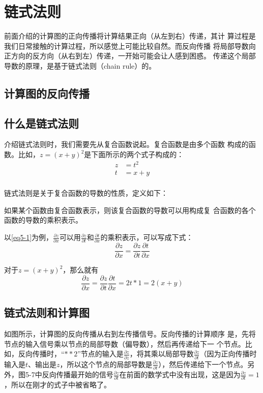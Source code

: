 \section{链式法则}
前面介绍的计算图的正向传播将计算结果正向（从左到右）传递，其计
算过程是我们日常接触的计算过程，所以感觉上可能比较自然。而反向传播
将局部导数向正方向的反方向（从右到左）传递，一开始可能会让人感到困惑。
传递这个局部导数的原理，是基于链式法则（chain rule）的。
\subsection{计算图的反向传播}

\subsection{什么是链式法则}
介绍链式法则时，我们需要先从复合函数说起。复合函数是由多个函数
构成的函数。比如，$z = (x + y)^2$是下面所示的两个式子构成的：
\begin{equation}
    \label{eq5-1}
    \begin{aligned}
        z & =t^2 \\
        t & =x+y \\
    \end{aligned}
\end{equation}

链式法则是关于复合函数的导数的性质，定义如下：
\begin{tcolorbox}
    如果某个函数由复合函数表示，则该复合函数的导数可以用构成复
    合函数的各个函数的导数的乘积表示。
\end{tcolorbox}

以\autoref{eq5-1}为例，$\frac{\partial z}{\partial x}$可以用$\frac{\partial z}{\partial t}$和$\frac{\partial t}{\partial x}$的乘积表示，可以写成下式：
\begin{equation}
    \frac{\partial z}{\partial x}=\frac{\partial z}{\partial t}\frac{\partial t}{\partial x}
\end{equation}

对于$z = (x + y)^2$，那么就有
\begin{equation*}
    \frac{\partial z}{\partial x}=\frac{\partial z}{\partial t}\frac{\partial t}{\partial x}=2t*1=2(x+y)
\end{equation*}
\subsection{链式法则和计算图}
如图所示，计算图的反向传播从右到左传播信号。反向传播的计算顺序
是，先将节点的输入信号乘以节点的局部导数（偏导数），然后再传递给下一
个节点。比如，反向传播时，“$**2$”节点的输入是$\frac{\partial z}{\partial z}$，将其乘以局部导数$\frac{\partial z}{\partial t}$（因为正向传播时输入是$t$、输出是$z$，所以这个节点的局部导数是$\frac{\partial z}{\partial t}$），然后传递给下一个节点。另外，图5-7中反向传播最开始的信号$\frac{\partial z}{\partial t}$在前面的数学式中没有出现，这是因为$\frac{\partial z}{\partial t}=1$，所以在刚才的式子中被省略了。

